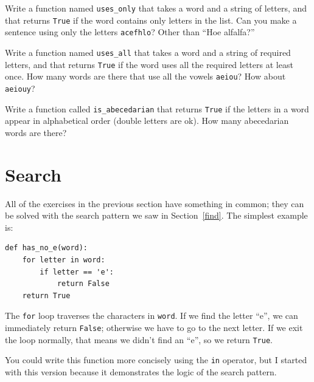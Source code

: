 \documentclass[10pt]{book}
\begin{document}
\begin{exercise}

Write a function named \verb"uses_only" that takes a word and a
string of letters, and that returns {\tt True} if the word contains
only letters in the list.  Can you make a sentence using only the
letters {\tt acefhlo}?  Other than ``Hoe alfalfa?''

\end{exercise}


\begin{exercise} 

Write a function named \verb"uses_all" that takes a word and a
string of required letters, and that returns {\tt True} if the word
uses all the required letters at least once.  How many words are there
that use all the vowels {\tt aeiou}?  How about {\tt aeiouy}?

\end{exercise}


\begin{exercise}

Write a function called \verb"is_abecedarian" that returns
{\tt True} if the letters in a word appear in alphabetical order
(double letters are ok).  
How many abecedarian words are there?


\end{exercise}



\section{Search}
\label{search}

All of the exercises in the previous section have something
in common; they can be solved with the search pattern we saw
in Section~\ref{find}.  The simplest example is:

\begin{verbatim}
def has_no_e(word):
    for letter in word:
        if letter == 'e':
            return False
    return True
\end{verbatim}
%
The {\tt for} loop traverses the characters in {\tt word}.  If we find
the letter ``e'', we can immediately return {\tt False}; otherwise we
have to go to the next letter.  If we exit the loop normally, that
means we didn't find an ``e'', so we return {\tt True}.

You could write this function more concisely using the {\tt in}
operator, but I started with this version because it 
demonstrates the logic of the search pattern.
\end{document}
